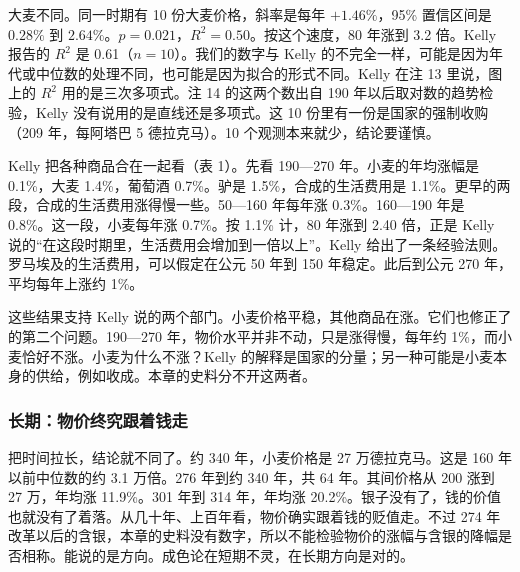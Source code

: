 大麦不同。同一时期有 10 份大麦价格，斜率是每年 $+1.46\%$，95\% 置信区间是 $0.28\%$ 到 $2.64\%$。$p=0.021$，$R^{2}=0.50$。按这个速度，80 年涨到 3.2 倍。Kelly 报告的 $R^{2}$ 是 0.61（$n=10$）\cite{kelly2021}。我们的数字与 Kelly 的不完全一样，可能是因为年代或中位数的处理不同，也可能是因为拟合的形式不同。Kelly 在注 13 里说，图上的 $R^{2}$ 用的是三次多项式。注 14 的这两个数出自 190 年以后取对数的趋势检验，Kelly 没有说用的是直线还是多项式\cite{kelly2021}。这 10 份里有一份是国家的强制收购（209 年，每阿塔巴 5 德拉克马）。10 个观测本来就少，结论要谨慎。

Kelly 把各种商品合在一起看（表 1）。先看 190—270 年。小麦的年均涨幅是 0.1\%，大麦 1.4\%，葡萄酒 0.7\%。驴是 1.5\%，合成的生活费用是 1.1\%。更早的两段，合成的生活费用涨得慢一些。50—160 年每年涨 0.3\%。160—190 年是 0.8\%。这一段，小麦每年涨 0.7\%\cite{kelly2021}。按 1.1\% 计，80 年涨到 2.40 倍，正是 Kelly 说的“在这段时期里，生活费用会增加到一倍以上”\cite{kelly2021}。Kelly 给出了一条经验法则。罗马埃及的生活费用，可以假定在公元 50 年到 150 年稳定。此后到公元 270 年，平均每年上涨约 1\%\cite{kelly2021}。


这些结果支持 Kelly 说的两个部门。小麦价格平稳，其他商品在涨。它们也修正了 的第二个问题。190—270 年，物价水平并非不动，只是涨得慢，每年约 1\%，而小麦恰好不涨。小麦为什么不涨？Kelly 的解释是国家的分量；另一种可能是小麦本身的供给，例如收成。本章的史料分不开这两者。

\subsubsection{长期：物价终究跟着钱走}
把时间拉长，结论就不同了。约 340 年，小麦价格是 27 万德拉克马。这是 160 年以前中位数的约 3.1 万倍。276 年到约 340 年，共 64 年。其间价格从 200 涨到 27 万，年均涨 11.9\%。301 年到 314 年，年均涨 20.2\%。银子没有了，钱的价值也就没有了着落。从几十年、上百年看，物价确实跟着钱的贬值走。不过 274 年改革以后的含银，本章的史料没有数字，所以不能检验物价的涨幅与含银的降幅是否相称。能说的是方向。成色论在短期不灵，在长期方向是对的。

